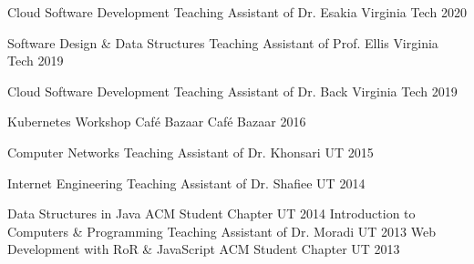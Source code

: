 

\begin{cvhonors}

  \cvhonor
    {Cloud Software Development} %
    {Teaching Assistant of Dr. Esakia} %
    {Virginia Tech} %
    {2020} %

  \cvhonor
    {Software Design \& Data Structures} %
    {Teaching Assistant of Prof. Ellis} %
    {Virginia Tech} %
    {2019} %

  \cvhonor
    {Cloud Software Development} %
    {Teaching Assistant of Dr. Back} %
    {Virginia Tech} %
    {2019} %

  \cvhonor
    {Kubernetes Workshop} %
    {Café Bazaar} %
    {Café Bazaar} %
    {2016} %

  \cvhonor
    {Computer Networks} %
    {Teaching Assistant of Dr. Khonsari} %
    {UT} %
    {2015} %

  \cvhonor
    {Internet Engineering} %
    {Teaching Assistant of Dr. Shafiee} %
    {UT} %
    {2014} %

  \cvhonor
    {Data Structures in Java} %
    {ACM Student Chapter} %
    {UT} %
    {2014} %
  \cvhonor
    {Introduction to Computers \& Programming} %
    {Teaching Assistant of Dr. Moradi} %
    {UT} %
    {2013} %
  \cvhonor
    {Web Development with RoR \& JavaScript} %
    {ACM Student Chapter} %
    {UT} %
    {2013} %
\end{cvhonors}
